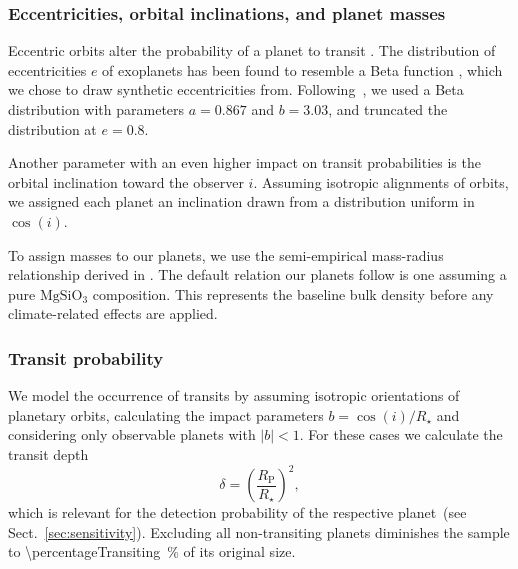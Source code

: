 \documentclass[modern]{aastex631}
\begin{document}
\subsubsection{Eccentricities, orbital inclinations, and planet masses}
Eccentric orbits alter the probability of a planet to transit \citep[e.g.,][]{Barnes2007a}.
The distribution of eccentricities $e$ of exoplanets has been found to resemble a Beta function \citep{Kipping2013b}, which we chose to draw synthetic eccentricities from.
Following~\citet{Kipping2013b}, we used a Beta distribution with parameters $a=0.867$ and $b=3.03$, and truncated the distribution at $e = 0.8$.

Another parameter with an even higher impact on transit probabilities is the orbital inclination toward the observer $i$.
Assuming isotropic alignments of orbits, we assigned each planet an inclination drawn from a distribution uniform in $\cos(i)$.

To assign masses to our planets, we use the semi-empirical mass-radius relationship derived in \citet{Zeng2016}.
The default relation our planets follow is one assuming a pure $\mathrm{MgSiO_3}$ composition.
This represents the baseline bulk density before any climate-related effects are applied.


\subsubsection{Transit probability}
\begin{note}
    We model the occurrence of transits by assuming isotropic orientations of planetary orbits, calculating the impact parameters $b = \cos(i)/R_\star$ and considering only observable planets with $|b| < 1$.
    For these cases we calculate the transit depth
    \begin{equation}\label{eq:transitdepth}
        \delta = \left( \frac{R_\mathrm{P}}{R_\star} \right)^2,
    \end{equation}
    which is relevant for the detection probability of the respective planet~(see Sect.~\ref{sec:sensitivity}).
    Excluding all non-transiting planets diminishes the sample to \SI{\percentageTransiting}{\percent} of its original size.
\end{note}
\end{document}
